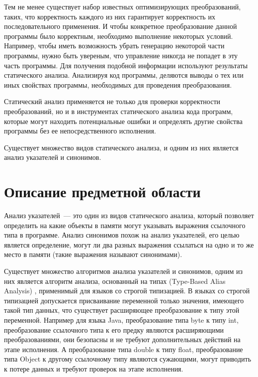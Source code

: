 \documentclass[14pt,titlepage]{extarticle}
\newcommand{\eng}[1]{{\English#1}}
\begin{document}
    Тем не менее существует набор известных оптимизирующих преобразований,
    таких, что корректность каждого из них гарантирует корректность их
    последовательного применения.
    И чтобы конкретное преобразование данной программы было корректным,
    необходимо выполнение некоторых условий. Например, чтобы иметь
    возможность убрать генерацию некоторой части программы, нужно быть
    увереным, что управление никогда не попадет в эту часть программы.
    Для получения подобной информации используют результаты статического
    анализа. Анализируя код программы, деляются выводы о тех или иных свойствах
    программы, необходимых для проведения преобразования.

    Статический анализ применяется не только для проверки
    корректности преобразований, но и в инструментах статического анализа
    кода программ, которые могут находить потенциальные ошибки и определять
    другие свойства программы без ее непосредственного исполнения.

    Существует множество видов статического анализа, и одним из них
    является анализ указателей и синонимов.

  \newpage
  \section{Описание предметной области}\label{section:overview}

    Анализ указателей~--- это один из видов статического анализа, который
    позволяет определить на какие объекты в памяти могут указывать выражения
    ссылочного типа в программе. Анализ синонимов похож на анализ указателей,
    его целью является определение, могут ли два разных выражения ссылаться
    на одно и то же место в памяти (такие выражения называют синонимами).

    Существует множество алгоритмов анализа указателей и синонимов,
    одним из них является алгоритм анализа, основанный на типах
    (\eng{Type-Based Alias Analysis}) \cite{diwan_tbaa},
    применимый для языков со строгой типизацией.
    В языках со строгой типизацией допускается присваивание переменной только
    значения, имеющего такой тип данных, что существует расширяющее
    преобразование к типу этой переменной.
    Например для языка Java, преобразование типа byte к типу int,
    преобразование ссылочного типа к его предку являются расширяющими
    преобразованиями, они безопасны и не требуют дополнительных действий
    на этапе исполнения.
    А преобразование типа double к типу float, преобразование типа
    Object к другому ссылочному типу являются сужающими, могут приводить к
    потере данных и требуют проверок на этапе исполнения.
\end{document}
